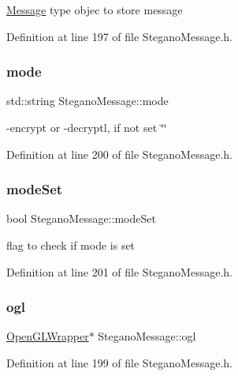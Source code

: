 \mbox{\hyperlink{classMessage}{Message}} type objec to store message 

Definition at line 197 of file Stegano\+Message.\+h.

\mbox{\label{classSteganoMessage_a8772194b7823da730648f8d4c06334a8}} 
\subsubsection{\texorpdfstring{mode}{mode}}
{\footnotesize\ttfamily std\+::string Stegano\+Message\+::mode\hspace{0.3cm}{\ttfamily [private]}}

-\/encrypt or -\/decryptl, if not set \char`\"{}\char`\"{} 

Definition at line 200 of file Stegano\+Message.\+h.

\mbox{\label{classSteganoMessage_ae1da17c621a8db71fa4eb3b148a82ceb}} 
\subsubsection{\texorpdfstring{modeSet}{modeSet}}
{\footnotesize\ttfamily bool Stegano\+Message\+::mode\+Set\hspace{0.3cm}{\ttfamily [private]}}

flag to check if mode is set 

Definition at line 201 of file Stegano\+Message.\+h.

\mbox{\label{classSteganoMessage_aa64b05c1ea93d5403571f25f0902e2e3}} 
\subsubsection{\texorpdfstring{ogl}{ogl}}
{\footnotesize\ttfamily \mbox{\hyperlink{classOpenGLWrapper}{Open\+G\+L\+Wrapper}}$\ast$ Stegano\+Message\+::ogl\hspace{0.3cm}{\ttfamily [private]}}



Definition at line 199 of file Stegano\+Message.\+h.

